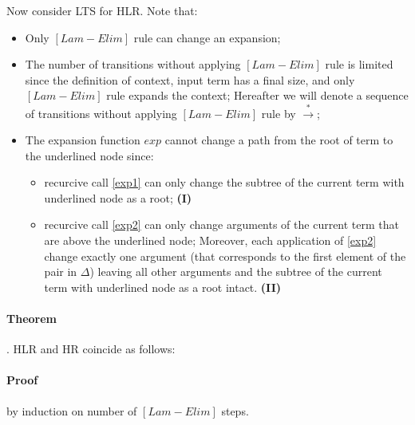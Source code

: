 \documentclass[a4paper, 10pt]{article}
\begin{document}
Now consider LTS for HLR. Note that:
\begin{itemize}
\item Only $[Lam-Elim]$ rule can change an expansion;
\item The number of transitions without applying $[Lam-Elim]$ rule is limited since the definition of context, input term has a final size, and only $[Lam-Elim]$ rule expands the context; Hereafter we will denote a sequence of transitions without applying $[Lam-Elim]$ rule by $\overset{*}{\rightarrow}$;
\item The expansion function $exp$ cannot change a path from the root of term to the underlined node since:
  \begin{itemize}
  \item recurcive call \eqref{exp1} can only change the subtree of the current term with underlined node as a root; \hfill{\textbf{(I)}}
  \item recurcive call \eqref{exp2} can only change arguments of the current term that are above the underlined node; Moreover, each application of \eqref{exp2} change exactly one argument (that corresponds to the first element of the pair in $\Delta$) leaving all other arguments and the subtree of the current term with underlined node as a root intact. \hfill{\textbf{(II)}}
  \end{itemize}
\end{itemize}


\paragraph{Theorem}. HLR and HR coincide as follows:


\paragraph{Proof} by induction on number of $[Lam-Elim]$ steps.
\end{document}
